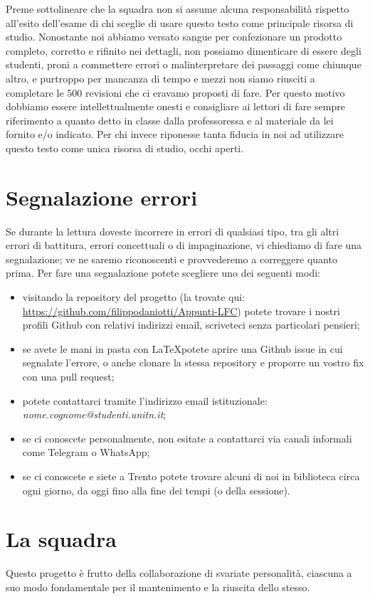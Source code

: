 \documentclass[class=book, crop=false, oneside, 12pt]{standalone}
\begin{document}
Preme sottolineare che la squadra non si assume alcuna responsabilità rispetto all'esito dell'esame di chi sceglie di usare questo testo come principale risorsa di studio. Nonostante noi abbiamo versato sangue per confezionare un prodotto completo, corretto e rifinito nei dettagli, non possiamo dimenticare di essere degli studenti, proni a commettere errori o malinterpretare dei passaggi come chiunque altro, e purtroppo per mancanza di tempo e mezzi non siamo riusciti a completare le 500 revisioni che ci eravamo proposti di fare. Per questo motivo dobbiamo essere intellettualmente onesti e consigliare ai lettori di fare sempre riferimento a quanto detto in classe dalla professoressa e al materiale da lei fornito e/o indicato. Per chi invece riponesse tanta fiducia in noi ad utilizzare questo testo come unica risorsa di studio, occhi aperti.

\section*{Segnalazione errori}
Se durante la lettura doveste incorrere in errori di qualsiasi tipo, tra gli altri errori di battitura, errori concettuali o di impaginazione, vi chiediamo di fare una segnalazione; ve ne saremo riconoscenti e provvederemo a correggere quanto prima. Per fare una segnalazione potete scegliere uno dei seguenti modi:
\begin{itemize}
    \item visitando la repository del progetto (la trovate qui: \url{https://github.com/filippodaniotti/Appunti-LFC}) potete trovare i nostri profili Github con relativi indirizzi email, scriveteci senza particolari pensieri;
    \item se avete le mani in pasta con \LaTeX  potete aprire una Github issue in cui segnalate l'errore, o anche clonare la stessa repository e proporre un vostro fix con una pull request;
    \item potete contattarci tramite l'indirizzo email istituzionale: \emph{nome.cognome@studenti.unitn.it};
    \item se ci conoscete personalmente, non esitate a contattarci via canali informali come Telegram o WhatsApp;
    \item se ci conoscete e siete a Trento potete trovare alcuni di noi in biblioteca circa ogni giorno, da oggi fino alla fine dei tempi (o della sessione).
\end{itemize}

\section*{La squadra}
Questo progetto è frutto della collaborazione di svariate personalità, ciascuna a suo modo fondamentale per il mantenimento e la riuscita dello stesso.
\end{document}
